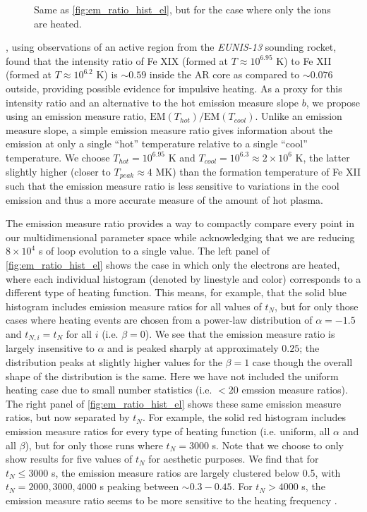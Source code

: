 \documentclass[apj]{emulateapj}
\begin{document}
\begin{figure}
{		}
		\caption{Same as \autoref{fig:em_ratio_hist_el}, but for the case where only the ions are heated.}
		\label{fig:em_ratio_hist_ion}
	\end{figure}
	\par\citet{brosius_pervasive_2014}, using observations of an active region from the \textit{EUNIS-13} sounding rocket, found that the intensity ratio of Fe XIX (formed at $T\approx10^{6.95}$ K) to Fe XII (formed at $T\approx10^{6.2}$ K) is $\sim0.59$ inside the AR core as compared to $\sim0.076$ outside, providing possible evidence for impulsive heating. As a proxy for this intensity ratio and an alternative to the hot emission measure slope $b$, we propose using an emission measure ratio, $\mathrm{EM}(T_{hot})/\mathrm{EM}(T_{cool})$. Unlike an emission measure slope, a simple emission measure ratio gives information about the emission at only a single ``hot'' temperature relative to a single ``cool'' temperature. We choose $T_{hot}=10^{6.95}$ K and $T_{cool}=10^{6.3}\approx2\times10^6$ K, the latter slightly higher (closer to $T_{peak}\approx4$ MK) than the formation temperature of Fe XII such that the emission measure ratio is less sensitive to variations in the cool emission and thus a more accurate measure of the amount of hot plasma. 
	\par The emission measure ratio provides a way to compactly compare every point in our multidimensional parameter space while acknowledging that we are reducing $8\times10^4$ s of loop evolution to a single value. The left panel of \autoref{fig:em_ratio_hist_el} shows the case in which only the electrons are heated, where each individual histogram (denoted by linestyle and color) corresponds to a different type of heating function. This means, for example, that the solid blue histogram includes emission measure ratios for all values of $t_N$, but for only those cases where heating events are chosen from a power-law distribution of $\alpha=-1.5$ and $t_{N,i}=t_N$ for all $i$ (i.e. $\beta=0$). We see that the emission measure ratio is largely insensitive to $\alpha$ and is peaked sharply at approximately $0.25$; the distribution peaks at slightly higher values for the $\beta=1$ case though the overall shape of the distribution is the same. Here we have not included the uniform heating case due to small number statistics (i.e. $<20$ emssion measure ratios). The right panel of \autoref{fig:em_ratio_hist_el} shows these same emission measure ratios, but now separated by $t_N$. For example, the solid red histogram includes emission measure ratios for every type of heating function (i.e. uniform, all $\alpha$ and all $\beta$), but for only those runs where $t_N=3000$ s. Note that we choose to only show results for five values of $t_N$ for aesthetic purposes. We find that for $t_N\le3000$ s, the emission measure ratios are largely clustered below 0.5, with $t_N=2000,3000,4000$ s peaking between $\sim0.3-0.45$. For $t_N>4000$ s, the emission measure ratio seems to be more sensitive to the heating frequency .
\end{document}
